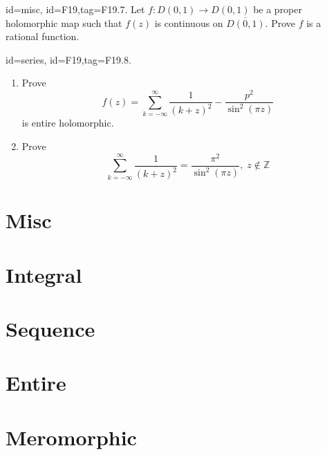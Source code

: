 \documentclass[12pt,letterpaper]{article}
\begin{document}
{\item[id=misc, id=F19,tag=F19.7.]
Let $f : D(0,1) \rightarrow D(0,1)$ be a proper holomorphic map such that $f(z)$ is continuous on $\overline{D(0,1)}$. Prove $f$ is a rational function.


\item[id=series, id=F19,tag=F19.8.]
\begin{enumerate}[label=(\alph*)]\onlyitems
\item Prove
\[
	f(z) = \sum_{k=-\infty}^{\infty} \frac{1}{(k+z)^2} - \frac{p^2}{\sin^2(\pi z)}
\]
is entire holomorphic.
\item Prove
\[
	\sum_{k=-\infty}^{\infty} \frac{1}{(k+z)^2} = \frac{\pi^2}{\sin^2(\pi z)}, \; z \notin \mathbb{Z}
\]
\end{enumerate}

}
\tableofcontents
\newpage
\section{Misc}
\begin{itemize}\setlength\itemsep{4em}\onlyitems[none, include=misc]
\mylist
\end{itemize}
\newpage

\section{Integral}
\begin{itemize}\setlength\itemsep{4em}\onlyitems[none, include=integral]
\mylist
\end{itemize}
\newpage

\section{Sequence}
\begin{itemize}\setlength\itemsep{4em}\onlyitems[none, include=sequence]
\mylist
\end{itemize}
\newpage

\section{Entire}
\begin{itemize}\setlength\itemsep{4em}\onlyitems[none, include=entire]
\mylist
\end{itemize}
\newpage

\section{Meromorphic}
\begin{itemize}\setlength\itemsep{4em}\onlyitems[none, include=meromorphic]
\mylist
\end{itemize}
\newpage
\end{document}
